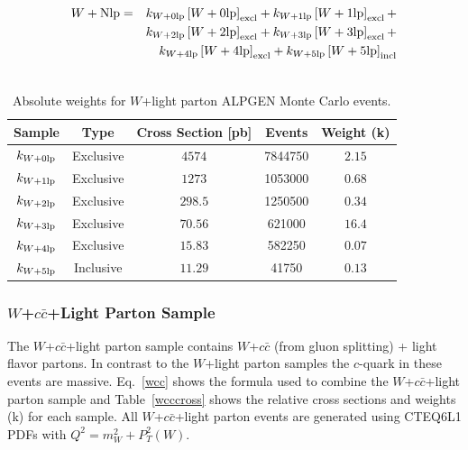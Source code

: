 \begin{eqnarray}
\label{wlp}
\nonumber
W+\rm{Nlp} &=& k_{W+0\rm{lp}} \left[W+0\rm{lp}\right]_{\rm{excl}} + k_{W+1\rm{lp}} \left[W+1\rm{lp}\right]_{\rm{excl}} + \\
\nonumber
& & k_{W+2\rm{lp}} \left[W+2\rm{lp}\right]_{\rm{excl}} + k_{W+3\rm{lp}} \left[W+3\rm{lp}\right]_{\rm{excl}} + \\
& & k_{W+4\rm{lp}} \left[W+4\rm{lp}\right]_{\rm{excl}} + k_{W+5\rm{lp}} \left[W+5\rm{lp}\right]_{\rm{incl}}	\\
\nonumber
\end{eqnarray}



\begin{table}[!h!tbp]
\begin{center}
\caption{Absolute weights for $W$+light parton ALPGEN Monte Carlo events.}
\label{wjjcross}
\begin{tabular}{c|cccc}
Sample			&	Type		&	Cross Section [pb]	&	Events	&	Weight (k) \\
\hline
$k_{W+0\rm{lp}}$	&	Exclusive	&	$4574$			&	7844750	&	$2.15$			\\
$k_{W+1\rm{lp}}$	&	Exclusive	&	$1273$			&	1053000	&	$0.68$			\\
$k_{W+2\rm{lp}}$	&	Exclusive	&	$298.5$			&	1250500	&	$0.34$	\\
$k_{W+3\rm{lp}}$	&	Exclusive	&	$70.56$			&	621000	&	$16.4$	\\
$k_{W+4\rm{lp}}$	&	Exclusive	&	$15.83$			&	582250	&	$0.07$	\\
$k_{W+5\rm{lp}}$	&	Inclusive	&	$11.29$			&	41750	&	$0.13$
\end{tabular}
\vspace{-0.1 in}
\end{center}
\end{table}

\subsubsection{$W$+$c\bar{c}$+Light Parton Sample}

The $W$+$c\bar{c}$+light parton sample contains $W$+$c\bar{c}$ (from gluon splitting) + light flavor partons. In contrast to the $W$+light parton samples the $c$-quark in these events are massive. Eq.~\ref{wcc} shows the formula used to combine the $W$+$c\bar{c}$+light parton sample and Table~\ref{wcccross} shows the relative cross sections and weights (k) for each sample. All $W$+$c\bar{c}$+light parton events are generated using CTEQ6L1 PDFs with $Q^{2}=m_{W}^{2} + P^{2}_{T}(W)$.

